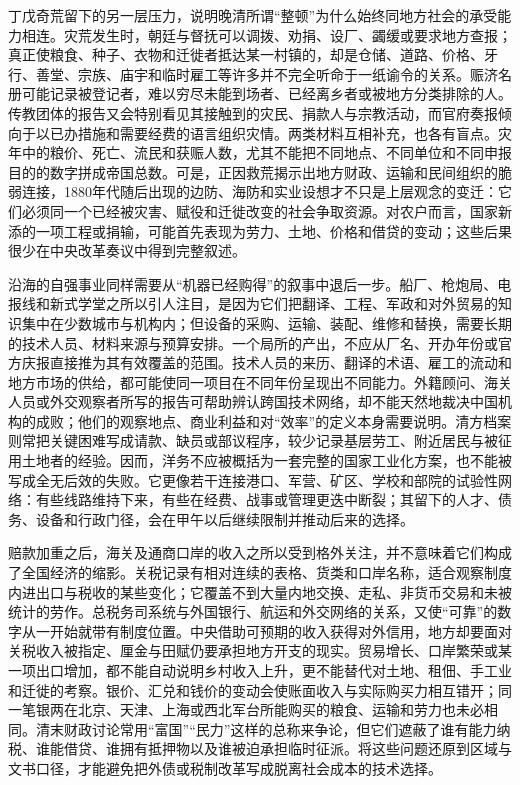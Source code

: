 丁戊奇荒留下的另一层压力，说明晚清所谓“整顿”为什么始终同地方社会的承受能力相连。灾荒发生时，朝廷与督抚可以调拨、劝捐、设厂、蠲缓或要求地方查报；真正使粮食、种子、衣物和迁徙者抵达某一村镇的，却是仓储、道路、价格、牙行、善堂、宗族、庙宇和临时雇工等许多并不完全听命于一纸谕令的关系。赈济名册可能记录被登记者，难以穷尽未能到场者、已经离乡者或被地方分类排除的人。传教团体的报告又会特别看见其接触到的灾民、捐款人与宗教活动，而官府奏报倾向于以已办措施和需要经费的语言组织灾情。两类材料互相补充，也各有盲点。灾年中的粮价、死亡、流民和获赈人数，尤其不能把不同地点、不同单位和不同申报目的的数字拼成帝国总数。可是，正因救荒揭示出地方财政、运输和民间组织的脆弱连接，1880年代随后出现的边防、海防和实业设想才不只是上层观念的变迁：它们必须同一个已经被灾害、赋役和迁徙改变的社会争取资源。对农户而言，国家新添的一项工程或捐输，可能首先表现为劳力、土地、价格和借贷的变动；这些后果很少在中央改革奏议中得到完整叙述。

沿海的自强事业同样需要从“机器已经购得”的叙事中退后一步。船厂、枪炮局、电报线和新式学堂之所以引人注目，是因为它们把翻译、工程、军政和对外贸易的知识集中在少数城市与机构内；但设备的采购、运输、装配、维修和替换，需要长期的技术人员、材料来源与预算安排。一个局所的产出，不应从厂名、开办年份或官方庆报直接推为其有效覆盖的范围。技术人员的来历、翻译的术语、雇工的流动和地方市场的供给，都可能使同一项目在不同年份呈现出不同能力。外籍顾问、海关人员或外交观察者所写的报告可帮助辨认跨国技术网络，却不能天然地裁决中国机构的成败；他们的观察地点、商业利益和对“效率”的定义本身需要说明。清方档案则常把关键困难写成请款、缺员或部议程序，较少记录基层劳工、附近居民与被征用土地者的经验。因而，洋务不应被概括为一套完整的国家工业化方案，也不能被写成全无后效的失败。它更像若干连接港口、军营、矿区、学校和部院的试验性网络：有些线路维持下来，有些在经费、战事或管理更迭中断裂；其留下的人才、债务、设备和行政门径，会在甲午以后继续限制并推动后来的选择。

赔款加重之后，海关及通商口岸的收入之所以受到格外关注，并不意味着它们构成了全国经济的缩影。关税记录有相对连续的表格、货类和口岸名称，适合观察制度内进出口与税收的某些变化；它覆盖不到大量内地交换、走私、非货币交易和未被统计的劳作。总税务司系统与外国银行、航运和外交网络的关系，又使“可靠”的数字从一开始就带有制度位置。中央借助可预期的收入获得对外信用，地方却要面对关税收入被指定、厘金与田赋仍要承担地方开支的现实。贸易增长、口岸繁荣或某一项出口增加，都不能自动说明乡村收入上升，更不能替代对土地、租佃、手工业和迁徙的考察。银价、汇兑和钱价的变动会使账面收入与实际购买力相互错开；同一笔银两在北京、天津、上海或西北军台所能购买的粮食、运输和劳力也未必相同。清末财政讨论常用“富国”“民力”这样的总称来争论，但它们遮蔽了谁有能力纳税、谁能借贷、谁拥有抵押物以及谁被迫承担临时征派。将这些问题还原到区域与文书口径，才能避免把外债或税制改革写成脱离社会成本的技术选择。

